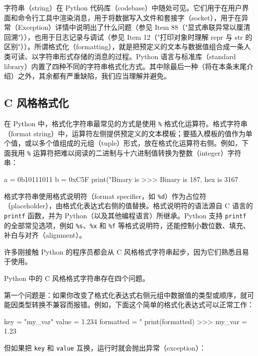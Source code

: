 字符串（string）在 Python 代码库（codebase）中随处可见。它们用于在用户界面和命令行工具中渲染消息，用于将数据写入文件和套接字（socket），用于在异常（Exception）详情中说明出了什么问题（参见 Item 88（"显式串联异常以厘清回溯"）），也用于日志记录与调试（参见 Item 12（"打印对象时理解 repr 与 str 的区别"））。所谓格式化（formatting），就是把预定义的文本与数据值组合成一条人类可读、以字符串形式存储的消息的过程。Python 语言与标准库（standard library）内置了四种不同的字符串格式化方式。其中除最后一种（将在本条末尾介绍）之外，其余都有严重缺陷，我们应当理解并避免。

\subsection{C 风格格式化}

在 Python 中，格式化字符串最常见的方式是使用 \texttt{\%} 格式化运算符。格式字符串（format string）中，运算符左侧提供预定义的文本模板；要插入模板的值作为单个值，或以多个值组成的元组（tuple）形式，放在格式化运算符右侧。例如，下面我用 \texttt{\%} 运算符把难以阅读的二进制与十六进制值转换为整数（integer）字符串：

\begin{codebox}[python]
a = 0b10111011
b = 0xC5F
print("Binary is %
>>>
Binary is 187, hex is 3167
\end{codebox}

格式字符串使用格式说明符（format specifier，如 \texttt{\%d}）作为占位符（placeholder），由格式化表达式右侧的值替换。格式说明符的语法源自 C 语言的 \texttt{printf} 函数，并为 Python（以及其他编程语言）所继承。Python 支持 \texttt{printf} 的全部常见选项，例如 \texttt{\%s}、\texttt{\%x} 和 \texttt{\%f} 等格式说明符，还能控制小数位数、填充、补白与对齐（alignment）。

许多刚接触 Python 的程序员都会从 C 风格格式字符串起步，因为它们熟悉且易于使用。

Python 中的 C 风格格式字符串存在四个问题。

第一个问题是：如果你改变了格式化表达式右侧元组中数据值的类型或顺序，就可能因类型转换不兼容而报错。例如，下面这个简单的格式化表达式可以正常工作：

\begin{codebox}[python]
key = "my_var"
value = 1.234
formatted = "%
print(formatted)
>>>
my_var     = 1.23
\end{codebox}

但如果把 \texttt{key} 和 \texttt{value} 互换，运行时就会抛出异常（exception）：

